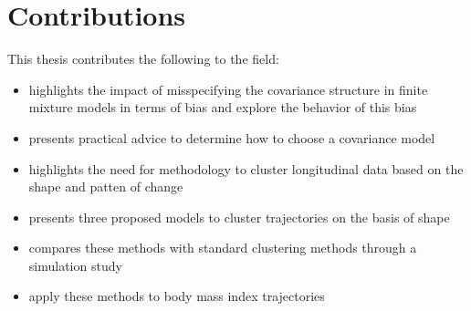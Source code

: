 \section{Contributions}
This thesis contributes the following to the field:
\begin{itemize}
\item highlights the impact of misspecifying the covariance structure in finite mixture models in terms of bias and explore the behavior of this bias
\item presents practical advice to determine how to choose a covariance model
\item highlights the need for methodology to cluster longitudinal data based on the shape and patten of change
\item presents three proposed models to cluster trajectories on the basis of shape
\item compares these methods with standard clustering methods through a simulation study
\item apply these methods to body mass index trajectories
\end{itemize}
